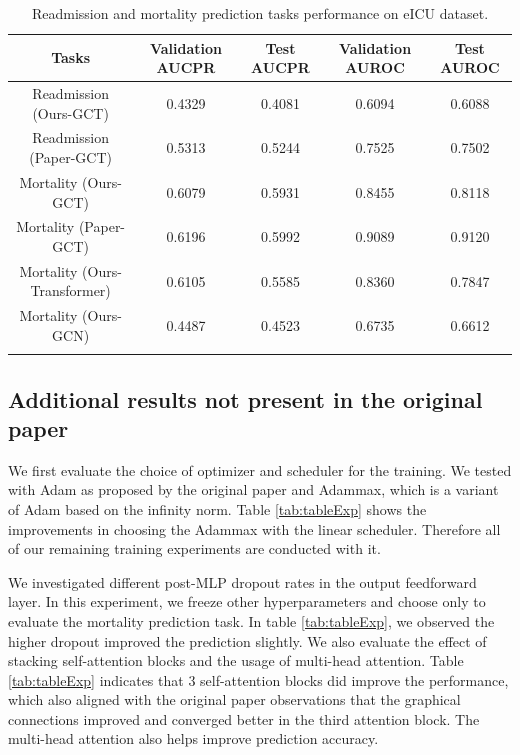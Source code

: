 \documentclass[11pt,a4paper]{article}
\begin{document}
\begin{table}[hbtp]
    \centering
    \begin{tabular}{c c c c c }
        \Xhline{2\arrayrulewidth}
        Tasks & Validation AUCPR & Test AUCPR & Validation AUROC & Test AUROC \\
        \hline
        Readmission (Ours-GCT) & 0.4329 & 0.4081 & 0.6094 & 0.6088 \\
        \hline
        Readmission (Paper-GCT) & 0.5313 & 0.5244 & 0.7525 & 0.7502 \\
        \hline
        Mortality (Ours-GCT) & 0.6079 & 0.5931 & 0.8455 & 0.8118 \\
        \hline
        Mortality (Paper-GCT) & 0.6196 & 0.5992 & 0.9089 & 0.9120 \\
        \hline
        Mortality (Ours-Transformer) & 0.6105 & 0.5585 & 0.8360 & 0.7847 \\
        \hline
        Mortality (Ours-GCN) & 0.4487 & 0.4523 & 0.6735 & 0.6612 \\
        \Xhline{2\arrayrulewidth}
    \end{tabular}
    \caption{Readmission and mortality prediction tasks performance on eICU dataset.}
    \label{tab:pred_result_table}
\end{table}

\subsection{Additional results not present in the original paper}
\label{subsec:subsectionVisualize}
We first evaluate the choice of optimizer and scheduler for the training. We tested with Adam as proposed by the original paper and Adammax, which is a variant of Adam based on the infinity norm. Table \ref{tab:tableExp} shows the improvements in choosing the Adammax with the linear scheduler. Therefore all of our remaining training experiments are conducted with it.

We investigated different post-MLP dropout rates in the output feedforward layer. In this experiment, we freeze other hyperparameters and choose only to evaluate the mortality prediction task. In table \ref{tab:tableExp}, we observed the higher dropout improved the prediction slightly. We also evaluate the effect of stacking self-attention blocks and the usage of multi-head attention. Table \ref{tab:tableExp} indicates that 3 self-attention blocks did improve the performance, which also aligned with the original paper observations that the graphical connections improved and converged better in the third attention block. The multi-head attention also helps improve prediction accuracy.
\end{document}
